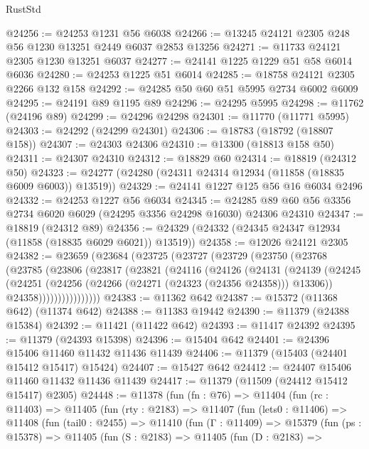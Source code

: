 \begin{lexlean}{RustStd}
\begin{coremodule}
@24256 := @24253 @1231 @56 @6038
@24266 := @13245 @24121 @2305 @248 @56 @1230 @13251 @2449 @6037 @2853 @13256
@24271 := @11733 @24121 @2305 @1230 @13251 @6037
@24277 := @24141 @1225 @1229 @51 @58 @6014 @6036
@24280 := @24253 @1225 @51 @6014
@24285 := @18758 @24121 @2305 @2266 @132 @158
@24292 := @24285 @50 @60 @51 @5995 @2734 @6002 @6009
@24295 := @24191 @89 @1195 @89
@24296 := @24295 @5995
@24298 := @11762 (@24196 @89)
@24299 := @24296 @24298
@24301 := @11770 (@11771 @5995)
@24303 := @24292 (@24299 @24301)
@24306 := @18783 (@18792 (@18807 @158))
@24307 := @24303 @24306
@24310 := @13300 (@18813 @158 @50)
@24311 := @24307 @24310
@24312 := @18829 @60
@24314 := @18819 (@24312 @50)
@24323 := @24277 (@24280 (@24311 @24314 @12934 (@11858 (@18835 @6009 @6003)) @13519))
@24329 := @24141 @1227 @125 @56 @16 @6034 @2496
@24332 := @24253 @1227 @56 @6034
@24345 := @24285 @89 @60 @56 @3356 @2734 @6020 @6029 (@24295 @3356 @24298 @16030) @24306 @24310
@24347 := @18819 (@24312 @89)
@24356 := @24329 (@24332 (@24345 @24347 @12934 (@11858 (@18835 @6029 @6021)) @13519))
@24358 := @12026 @24121 @2305
@24382 := @23659
    (@23684
      (@23725
        (@23727
          (@23729
            (@23750
              (@23768
                (@23785
                  (@23806
                    (@23817
                      (@23821
                        (@24116
                          (@24126
                            (@24131
                              (@24139
                                (@24245
                                  (@24251
                                    (@24256 (@24266 (@24271 (@24323 (@24356 @24358))) @13306))
                                    @24358))))))))))))))))
@24383 := @11362 @642
@24387 := @15372 (@11368 @642) (@11374 @642)
@24388 := @11383 @19442
@24390 := @11379 (@24388 @15384)
@24392 := @11421 (@11422 @642)
@24393 := @11417 @24392
@24395 := @11379 (@24393 @15398)
@24396 := @15404 @642
@24401 := @24396 @15406 @11460 @11432 @11436 @11439
@24406 := @11379 (@15403 (@24401 @15412 @15417) @15424)
@24407 := @15427 @642
@24412 := @24407 @15406 @11460 @11432 @11436 @11439
@24417 := @11379 (@11509 (@24412 @15412 @15417) @2305)
@24448 := @11378
    (fun (fn : @76) =>
    @11404
      (fun (rc : @11403) =>
      @11405
        (fun (rty : @2183) =>
        @11407
          (fun (lets0 : @11406) =>
          @11408
            (fun (tail0 : @2455) =>
            @11410
              (fun (Γ : @11409) =>
              @15379
                (fun (ps : @15378) =>
                @11405
                  (fun (S : @2183) =>
                  @11405
                    (fun (D : @2183) =>

\end{coremodule}
\end{lexlean}
